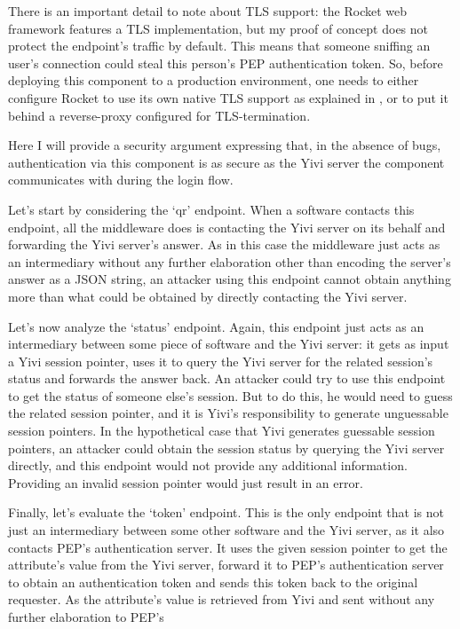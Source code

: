 \documentclass{report}
\begin{document}
There is an important detail to note about TLS support: the Rocket web framework features a TLS implementation, but my proof of concept does not protect the endpoint's traffic by
default. This means that someone sniffing an user's connection could steal this person's PEP authentication token. So, before deploying this component to a production environment,
one needs to either configure Rocket to use its own native TLS support as explained in \cite{rocket_guide_tls}, or to put it behind a reverse-proxy configured for TLS-termination.
\par
Here I will provide a security argument expressing that, in the absence of bugs, authentication via this component is as secure as the Yivi server the component communicates with
during the login flow. \par
Let's start by considering the \enquote*{qr} endpoint. When a software contacts this endpoint, all the middleware does is contacting the Yivi server on its
behalf and forwarding the Yivi server's answer. As in this case the middleware just acts as an intermediary without any further elaboration other than encoding the server's answer as
a JSON string, an attacker using this endpoint cannot obtain anything more than what could be obtained by directly contacting the Yivi server. \par
Let's now analyze the \enquote*{status} endpoint. Again, this endpoint just acts as an intermediary between some piece of software and the Yivi server: it gets as input a Yivi
session pointer, uses it to query the Yivi server for the related session's status and forwards the answer back. An attacker could try to use this endpoint to get the status of
someone else's session. But to do this, he would need to guess the related session pointer, and it is Yivi's responsibility to generate unguessable session pointers. In the
hypothetical case that Yivi generates guessable session pointers, an attacker could obtain the session status by querying the Yivi server directly, and this endpoint would not
provide any additional information. Providing an invalid session pointer would just result in an error. \par
Finally, let's evaluate the \enquote*{token} endpoint. This is the only endpoint that is not just an intermediary between some other software and the Yivi server, as it also
contacts PEP's authentication server. It uses the given session pointer to get the attribute's value from the Yivi server, forward it to PEP's authentication server to obtain an
authentication token and sends this token back to the original requester. As the attribute's value is retrieved from Yivi and sent without any further elaboration to PEP's
\end{document}
